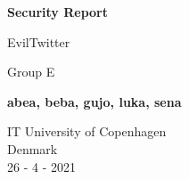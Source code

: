 \begin{titlepage}
    \begin{center}
        \vspace*{1cm}
            
        \Huge
        \textbf{Security Report}
            
        \vspace{0.5cm}
        \LARGE
        EvilTwitter
            
        \vspace{1.5cm}
        
        Group E
        
        \textbf{abea, beba, gujo, luka, sena}
            
        \vfill
            
            
        \vspace{0.5cm}
            
          

        \Large
        IT University of Copenhagen\\
        Denmark\\
        26 - 4 - 2021
            
    \end{center}
\end{titlepage}